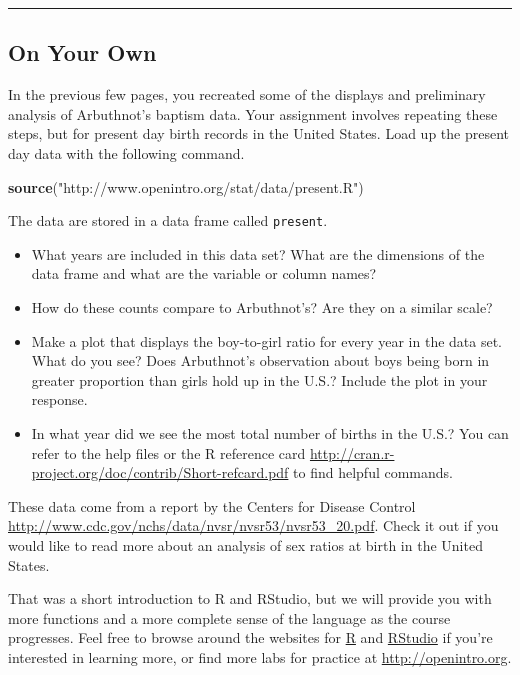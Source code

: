 \documentclass[
]{article}
\newenvironment{Shaded}{\begin{snugshade}}{\end{snugshade}}
\newcommand{\KeywordTok}[1]{\textcolor[rgb]{0.13,0.29,0.53}{\textbf{#1}}}
\newcommand{\NormalTok}[1]{#1}
\newcommand{\StringTok}[1]{\textcolor[rgb]{0.31,0.60,0.02}{#1}}
\begin{document}
\begin{center}\rule{0.5\linewidth}{0.5pt}\end{center}

\hypertarget{on-your-own}{%
\subsection{On Your Own}\label{on-your-own}}

In the previous few pages, you recreated some of the displays and
preliminary analysis of Arbuthnot's baptism data. Your assignment
involves repeating these steps, but for present day birth records in the
United States. Load up the present day data with the following command.

\begin{Shaded}
\begin{Highlighting}[]
\KeywordTok{source}\NormalTok{(}\StringTok{"http://www.openintro.org/stat/data/present.R"}\NormalTok{)}
\end{Highlighting}
\end{Shaded}

The data are stored in a data frame called \texttt{present}.

\begin{itemize}
\item
  What years are included in this data set? What are the dimensions of
  the data frame and what are the variable or column names?
\item
  How do these counts compare to Arbuthnot's? Are they on a similar
  scale?
\item
  Make a plot that displays the boy-to-girl ratio for every year in the
  data set. What do you see? Does Arbuthnot's observation about boys
  being born in greater proportion than girls hold up in the U.S.?
  Include the plot in your response.
\item
  In what year did we see the most total number of births in the U.S.?
  You can refer to the help files or the R reference card
  \url{http://cran.r-project.org/doc/contrib/Short-refcard.pdf} to find
  helpful commands.
\end{itemize}

These data come from a report by the Centers for Disease Control
\url{http://www.cdc.gov/nchs/data/nvsr/nvsr53/nvsr53_20.pdf}. Check it
out if you would like to read more about an analysis of sex ratios at
birth in the United States.

That was a short introduction to R and RStudio, but we will provide you
with more functions and a more complete sense of the language as the
course progresses. Feel free to browse around the websites for
\href{http://www.r-project.org}{R} and
\href{http://rstudio.org}{RStudio} if you're interested in learning
more, or find more labs for practice at \url{http://openintro.org}.
\end{document}
